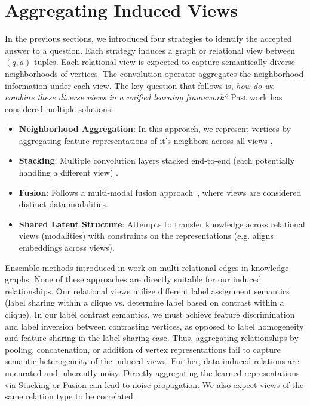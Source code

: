 \section{Aggregating Induced Views}
\label{sec:aggregation}
In the previous sections, we introduced four strategies to identify the accepted answer to a question. Each strategy induces a graph or relational view between $(q,a)$ tuples.
Each relational view is expected to capture semantically diverse neighborhoods of vertices. The convolution operator aggregates the neighborhood information under each view. The key question that follows is, \emph{how do we combine these diverse views in a unified learning framework?} Past work has considered multiple solutions:
\begin{itemize}
  \label{item:aggregator}
\item \textbf{Neighborhood Aggregation}: In this approach, we represent vertices by aggregating feature representations of it's neighbors across all views \cite{graphsage,relationalGCN}.
\item \textbf{Stacking}: Multiple convolution layers stacked end-to-end (each potentially handling a different view) \cite{Stacking}.
\item \textbf{Fusion}: Follows a multi-modal fusion approach~\cite{Fusion18}, where views are considered distinct data modalities.
\item \textbf{Shared Latent Structure}: Attempts to transfer knowledge across relational views (modalities) with constraints on the representations (e.g. \cite{DualGCN} aligns embeddings across views).
\end{itemize}

Ensemble methods introduced in \cite{relationalGCN} work on multi-relational edges in knowledge graphs. None of these approaches are directly suitable for our induced relationships. Our relational views utilize different label assignment semantics (label sharing within a clique vs. determine label based on contrast within a clique). In our label contrast semantics, we must achieve feature discrimination and label inversion between contrasting vertices, as opposed to label homogeneity and feature sharing in the label sharing case. Thus, aggregating relationships by pooling, concatenation, or addition of vertex representations fail to capture semantic heterogeneity of the induced views.
Further, data induced relations are uncurated and inherently noisy. Directly aggregating the learned representations via Stacking or Fusion can lead to noise propagation. We also expect views of the same relation type to be correlated.

